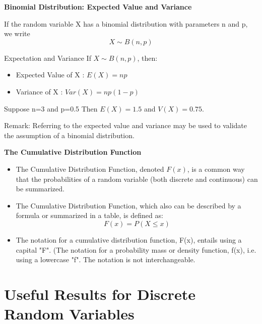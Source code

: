 \documentclass[]{report}
\begin{document}
{{}


{
\textbf{Binomial Distribution: Expected Value and Variance}


If the random variable X has a binomial distribution with parameters n
and p, we write
\[ X \sim B(n,p) \]

Expectation and Variance
If $X \sim B(n,p)$, then:

\begin{itemize}
\item  Expected Value of X : $E(X) = np$
\item  Variance of X : $Var(X) = np(1-p)$
\end{itemize}

Suppose n=3 and p=0.5 
Then $E(X) = 1.5$ and $V(X) = 0.75$.

Remark: Referring to the expected value and variance may be used to validate
the assumption of a binomial distribution.

}



\textbf{The Cumulative Distribution Function}
\begin{itemize}
\item  The Cumulative Distribution Function, denoted $F(x)$, is a common way that the probabilities
of a random variable (both discrete and continuous) can be summarized.
\item  The Cumulative Distribution Function, which also can be
described by a formula or summarized in a table, is defined as:
\[F(x) = P(X \leq x) \]
\item  The notation for a cumulative distribution function, F(x), entails using a capital
"F".  (The notation for a probability mass or density function, f(x), i.e. using a lowercase "f". The notation is not interchangeable.
\end{itemize}



\section{Useful Results for Discrete Random Variables}



}
\end{document}
